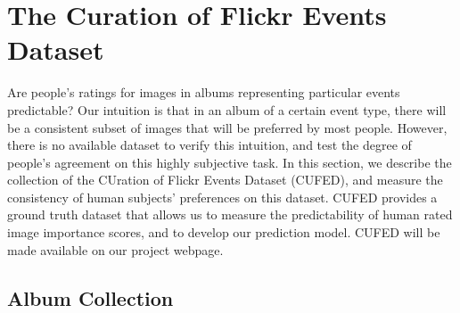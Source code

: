 \documentclass[10pt,twocolumn,letterpaper]{article}
\begin{document}
\section{The Curation of Flickr Events Dataset}
Are people's ratings for images in albums representing particular events predictable? Our intuition is that in an album of a certain event type, there will be a consistent subset of images that will be preferred by most people. However, there is no available dataset to verify this intuition, and test the degree of people's agreement on this highly subjective task. In this section, we describe the collection of the CUration of Flickr Events Dataset (CUFED), and measure the consistency of human subjects' preferences on this dataset. CUFED provides a ground truth dataset that allows us to measure the predictability of human rated image importance scores, and to develop our prediction model. CUFED will be made available on our project webpage. 
\subsection{Album Collection}
\end{document}
